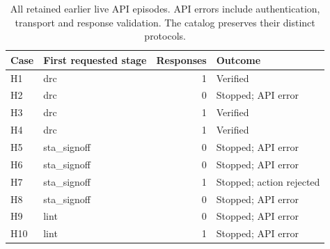 \begin{table}[htbp]\centering\small\setlength{\tabcolsep}{4pt}
\caption{All retained earlier live API episodes. API errors include authentication, transport and response validation. The catalog preserves their distinct protocols.}\label{tab:history}
\begin{tabular}{@{}llrl@{}}\toprule
Case & First requested stage & Responses & Outcome \\
\midrule
H1 & drc & 1 & Verified \\
H2 & drc & 0 & Stopped; API error \\
H3 & drc & 1 & Verified \\
H4 & drc & 1 & Verified \\
H5 & sta\_signoff & 0 & Stopped; API error \\
H6 & sta\_signoff & 0 & Stopped; API error \\
H7 & sta\_signoff & 1 & Stopped; action rejected \\
H8 & sta\_signoff & 0 & Stopped; API error \\
H9 & lint & 0 & Stopped; API error \\
H10 & lint & 1 & Stopped; API error \\
\bottomrule\end{tabular}\end{table}
